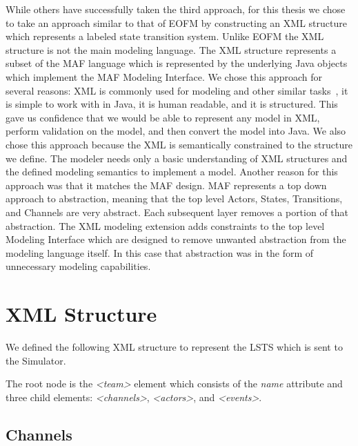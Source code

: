 While others have successfully taken the third approach, for this thesis we chose to take an approach similar to that of EOFM by constructing an XML structure which represents a labeled state transition system.  Unlike EOFM the XML structure is not the main modeling language.  The XML structure represents a subset of the MAF language which is represented by the underlying Java objects which implement the MAF Modeling Interface.  We chose this approach for several reasons:  XML is commonly used for modeling and other similar tasks~\cite{bolton2009enhanced}, it is simple to work with in Java, it is human readable, and it is structured.  This gave us confidence that we would be able to represent any model in XML, perform validation on the model, and then convert the model into Java.  We also chose this approach because the XML is semantically constrained to the structure we define.  The modeler needs only a basic understanding of XML structures and the defined modeling semantics to implement a model.  Another reason for this approach was that it matches the MAF design.  MAF represents a top down approach to abstraction, meaning that the top level Actors, States, Transitions, and Channels are very abstract.  Each subsequent layer removes a portion of that abstraction.  The XML modeling extension adds constraints to the top level Modeling Interface which are designed to remove unwanted abstraction from the modeling language itself.  In this case that abstraction was in the form of unnecessary modeling capabilities.

\section{XML Structure}

We defined the following XML structure to represent the LSTS which is sent to the Simulator.  

The root node is the {\em \textless team\textgreater} element which consists of the {\em name} attribute and three child elements: {\em \textless channels\textgreater}, {\em \textless actors\textgreater}, and {\em \textless events\textgreater}.

\begin{spacing}{.5}

\end{spacing}

\subsection{Channels}

